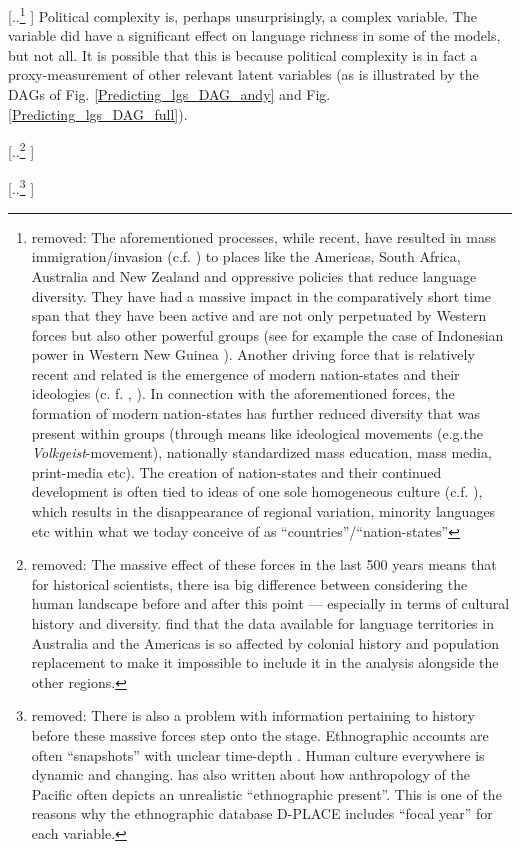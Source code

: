 \documentclass[unnumsec,webpdf,modern,medium]{oup-authoring-template}
\providecommand{\DIFaddtex}[1]{{\protect\color{blue} \sf #1}} %
\providecommand{\DIFdeltex}[1]{{\protect\color{red} [..\footnote{removed: #1} ]}} %
\providecommand{\DIFaddbegin}{} %
\providecommand{\DIFaddend}{} %
\providecommand{\DIFdelbegin}{} %
\providecommand{\DIFdelend}{} %
\providecommand{\DIFadd}[1]{\texorpdfstring{\DIFaddtex{#1}}{#1}} %
\providecommand{\DIFdel}[1]{\texorpdfstring{\DIFdeltex{#1}}{}} %
\newcommand{\DIFscaledelfig}{0.5}
\newlength{\DIFdelgraphicswidth} %
\newlength{\DIFdelgraphicsheight} %
\newcommand{\DIFaddincludegraphics}[2][]{{\color{blue}\fbox{\DIFOincludegraphics[#1]{#2}}}} %
\newcommand{\DIFdelincludegraphics}[2][]{%
\sbox{\DIFdelgraphicsbox}{\DIFOincludegraphics[#1]{#2}}%
\settoboxwidth{\DIFdelgraphicswidth}{\DIFdelgraphicsbox} %
\settoboxtotalheight{\DIFdelgraphicsheight}{\DIFdelgraphicsbox} %
\scalebox{\DIFscaledelfig}{%
\parbox[b]{\DIFdelgraphicswidth}{\usebox{\DIFdelgraphicsbox}\\[-\baselineskip] \rule{\DIFdelgraphicswidth}{0em}}\llap{\resizebox{\DIFdelgraphicswidth}{\DIFdelgraphicsheight}{%
\setlength{\unitlength}{\DIFdelgraphicswidth}%
\begin{picture}(1,1)%
\thicklines\linethickness{2pt} %
{\color[rgb]{1,0,0}\put(0,0){\framebox(1,1){}}}%
{\color[rgb]{1,0,0}\put(0,0){\line( 1,1){1}}}%
{\color[rgb]{1,0,0}\put(0,1){\line(1,-1){1}}}%
\end{picture}%
}\hspace*{3pt}}} %
} %
\DeclareRobustCommand{\DIFaddbegin}{\DIFOaddbegin \let\includegraphics\DIFaddincludegraphics} %
\DeclareRobustCommand{\DIFaddend}{\DIFOaddend \let\includegraphics\DIFOincludegraphics} %
\DeclareRobustCommand{\DIFdelbegin}{\DIFOdelbegin \let\includegraphics\DIFdelincludegraphics} %
\DeclareRobustCommand{\DIFdelend}{\DIFOaddend \let\includegraphics\DIFOincludegraphics} %
\begin{document}
\DIFdel{The aforementioned processes, while recent, have resulted in mass immigration/invasion (c.f. \citet{invasion_day}) to places like the Americas, South Africa, Australia and New Zealand and oppressive policies that reduce language diversity. They have had a massive impact in the comparatively short time span that they have been active and are not only perpetuated by Western forces but also other powerful groups (see for example the case of Indonesian power in Western New Guinea \citep{gietzelt1989indonesianization}). Another driving force that is relatively recent and related is the emergence of modern nation-states and their ideologies (c. f. \citet{foucault2007security}, \citet[21-22]{oakes2001language}). In connection with the aforementioned forces, the formation of modern nation-states has further reduced diversity that was present within groups (through means like ideological movements (e.g.the \emph{Volkgeist}-movement), nationally standardized mass education, mass media, print-media etc). The creation of nation-states and their continued development is often tied to ideas of one sole homogeneous culture (c.f. \citet{encyclo_nationalism}), which results in the disappearance of regional variation, minority languages etc within what we today conceive of as ``countries''/``nation-states''}\DIFdelend \DIFaddbegin \DIFadd{Political complexity is, perhaps unsurprisingly, a complex variable. The variable did have a significant effect on language richness in some of the models, but not all}\DIFaddend . \DIFaddbegin \DIFadd{It is possible that this is because political complexity is in fact a proxy-measurement of other relevant latent variables (as is illustrated by the DAGs of Fig. \ref{Predicting_lgs_DAG_andy} and Fig. \ref{Predicting_lgs_DAG_full}).
}\DIFaddend 

\DIFdelbegin \DIFdel{The massive effect of these forces in the last 500 years means that for historical scientists, there isa big difference between considering the human landscape before and after this point --- especially in terms of cultural history and diversity. \citet[7340-7341]{curriemace2009} find that the data available for language territories in Australia and the Americas is so affected by colonial history and population replacement to make it impossible to include it in the analysis alongside the other regions. 
}%

\DIFdel{There is also a problem with information pertaining to history before these massive forces step onto the stage. Ethnographic accounts are often ``snapshots'' with unclear time-depth 
 \citep[113]{bedford2008northern}. Human culture everywhere is dynamic and changing. \citet{meleisea1995} has also written about how anthropology of the Pacific often depicts an unrealistic ``ethnographic present''. This is one of the reasons why the ethnographic database D-PLACE \citep{d_place_all} includes ``focal year'' for each variable. 
}%
\end{document}
